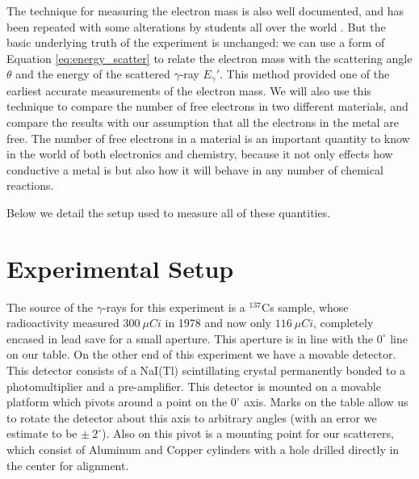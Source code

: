 \documentclass[%
 reprint,
 amsmath,amssymb,
 aps,
 pra,
]{revtex4-1}
\begin{document}
The technique for measuring the electron mass is also well documented, and has been repeated with some alterations by students all over the world \cite{emass_1, emass_2, emass_3}. But the basic underlying truth of the experiment is unchanged: we can use a form of Equation \ref{eq:energy_scatter} to relate the electron mass with the scattering angle $\theta$ and the energy of the scattered $\gamma$-ray $E_\gamma '$. This method provided one of the earliest accurate measurements of the electron mass. We will also use this technique to compare the number of free electrons in two different materials, and compare the results with our assumption that all the electrons in the metal are free. The number of free electrons in a material is an important quantity to know in the world of both electronics and chemistry, because it not only effects how conductive a metal is but also how it will behave in any number of chemical reactions.

Below we detail the setup used to measure all of these quantities.

\section{Experimental Setup}

The source of the $\gamma$-rays for this experiment is a $^{137}$Cs sample, whose radioactivity measured $300~\mu Ci$ in 1978 and now only $116~\mu Ci$, completely encased in lead save for a small aperture. This aperture is in line with the $0^\circ$ line on our table. On the other end of this experiment we have a movable detector. This detector consists of a NaI(Tl) scintillating crystal permanently bonded to a photomultiplier and a pre-amplifier. This detector is mounted on a movable platform which pivots around a point on the $0^\circ$ axis. Marks on the table allow us to rotate the detector about this axis to arbitrary angles (with an error we estimate to be $\pm ~2^\circ$). Also on this pivot is a mounting point for our scatterers, which consist of Aluminum and Copper cylinders with a hole drilled directly in the center for alignment. 
\end{document}
